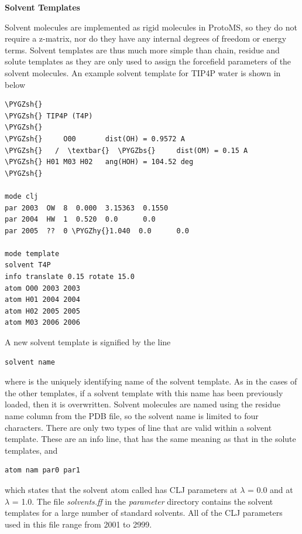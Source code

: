 \documentclass[letterpaper,10pt,english]{sphinxmanual}
\def\PYGZbs{\char`\\}
\def\PYGZsh{\char`\#}
\def\PYGZhy{\char`\-}
\begin{document}
\textbf{Solvent Templates}

Solvent molecules are implemented as rigid molecules in ProtoMS, so they do not require a z-matrix, nor do they have any internal degrees of freedom or energy terms. Solvent templates are thus much more simple than chain, residue and solute templates as they are only used to assign the forcefield parameters of the solvent molecules. An example solvent template for TIP4P water is shown in below

\begin{Verbatim}[commandchars=\\\{\}]
\PYGZsh{}
\PYGZsh{} TIP4P (T4P)
\PYGZsh{}
\PYGZsh{}     O00       dist(OH) = 0.9572 A
\PYGZsh{}   /  \textbar{}  \PYGZbs{}     dist(OM) = 0.15 A
\PYGZsh{} H01 M03 H02   ang(HOH) = 104.52 deg
\PYGZsh{}

mode clj
par 2003  OW  8  0.000  3.15363  0.1550
par 2004  HW  1  0.520  0.0      0.0
par 2005  ??  0 \PYGZhy{}1.040  0.0      0.0

mode template
solvent T4P
info translate 0.15 rotate 15.0
atom O00 2003 2003
atom H01 2004 2004
atom H02 2005 2005
atom M03 2006 2006
\end{Verbatim}

A new solvent template is signified by the line

\begin{Verbatim}[commandchars=\\\{\}]
solvent name
\end{Verbatim}

where  is the uniquely identifying name of the solvent template. As in the cases of the other templates, if a solvent template with this name has been previously loaded, then it is overwritten. Solvent molecules are named using the residue name column from the PDB file, so the solvent name is limited to four characters. There are only two types of line that are valid within a solvent template. These are an info line, that has the same meaning as that in the solute templates, and

\begin{Verbatim}[commandchars=\\\{\}]
atom nam par0 par1
\end{Verbatim}

which states that the solvent atom called  has CLJ parameters  at \(\lambda\) = 0.0 and  at \(\lambda\) = 1.0. The file \emph{solvents.ff} in the \emph{parameter} directory contains the solvent templates for a large number of standard solvents. All of the CLJ parameters used in this file range from 2001 to 2999.
\end{document}
